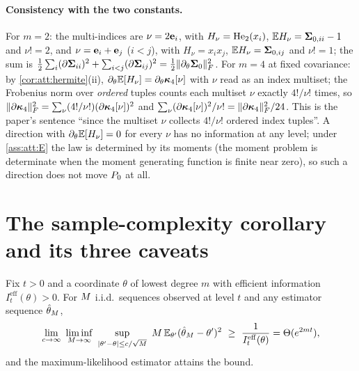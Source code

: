 \paragraph{Consistency with the two constants.} For $m=2$: the multi-indices are
$\nu=2\mathbf{e}_i$, with $H_\nu=\mathrm{He}_{2}(x_i)$, $\mathbb{E} H_\nu=\mathbf{\Sigma}_{0,ii}-1$ and $\nu!=2$, and
$\nu=\mathbf{e}_i+\mathbf{e}_j$ ($i<j$), with $H_\nu=x_ix_j$, $\mathbb{E} H_\nu=\mathbf{\Sigma}_{0,ij}$ and
$\nu!=1$; the sum is $\tfrac12\sum_i(\partial\mathbf{\Sigma}_{ii})^2+\sum_{i<j}(\partial\mathbf{\Sigma}_{ij})^2=\tfrac12\lVert \partial_\theta\mathbf{\Sigma}_0 \rVert_{F}^2$.
For $m=4$ at fixed covariance: by \cref{cor:att:hermite}(ii),
$\partial_\theta\mathbb{E}[H_\nu]=\partial_\theta\bm{\kappa}_4[\nu]$ with $\nu$ read as an index
multiset; the Frobenius norm over \emph{ordered} tuples counts each multiset $\nu$
exactly $4!/\nu!$ times, so $\lVert \partial\bm{\kappa}_4 \rVert_{F}^2=\sum_\nu(4!/\nu!)(\partial\bm{\kappa}_4[\nu])^2$
and $\sum_\nu(\partial\bm{\kappa}_4[\nu])^2/\nu!=\lVert \partial\bm{\kappa}_4 \rVert_{F}^2/24$. This is the paper's
sentence ``since the multiset $\nu$ collects $4!/\nu!$ ordered index tuples''. A
direction with $\partial_\theta\mathbb{E}[H_\nu]=0$ for every $\nu$ has no information at any
level; under \cref{ass:att:E} the law is determined by its moments (the moment problem
is determinate when the moment generating function is finite near zero), so such a
direction does not move $P_0$ at all.

\section{The sample-complexity corollary and its three caveats}
\label{sec:att:lam}

\begin{corollary}
\label{cor:att:lam}
Fix $t>0$ and a coordinate $\theta$ of lowest degree $m$ with efficient information
$I^{\mathrm{eff}}_t(\theta)>0$. For $M$ i.i.d.\ sequences observed at level $t$ and
any estimator sequence $\hat\theta_{M}$,
\[
  \lim_{c\to\infty}\ \liminf_{\nseq\to\infty}\ \sup_{|\theta'-\theta|\le c/\sqrt{\nseq}}\ \nseq\,\E_{\theta'}(\hat\theta_{\nseq}-\theta')^2
  \ \ge\ \frac1{I^{\mathrm{eff}}_t(\theta)}=\Theta(e^{2mt}),
\]
and the maximum-likelihood estimator attains the bound.
\end{corollary}

